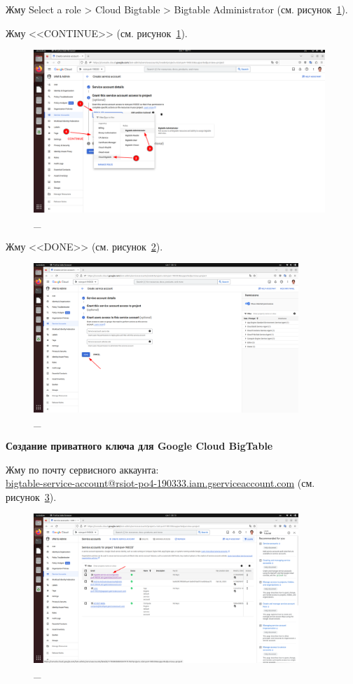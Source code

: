 \documentclass[12pt, a4paper, simple]{eskdtext}
\begin{document}
  Жму Select a role > Cloud Bigtable > Bigtable Administrator (см. рисунок~\ref{fig:12}).

  Жму <<CONTINUE>> (см. рисунок~\ref{fig:12}).

  \begin{figure}[!h]
    \centering
    \includegraphics[width=11cm]
    {images/GoogleCloudBigTable/2023-03-01_08-12-32.png}
    \caption{\_}
    \label{fig:12}
  \end{figure}

  Жму <<DONE>> (см. рисунок~\ref{fig:13}).

  \begin{figure}[!h]
    \centering
    \includegraphics[width=10cm]
    {images/GoogleCloudBigTable/2023-03-01_08-12-57.png}
    \caption{\_}
    \label{fig:13}
  \end{figure}

  \newpage
  \begin{center}
    \textbf{Создание приватного ключа для Google Cloud BigTable}
  \end{center}

  Жму по почту сервисного аккаунта: \\
  \underline{bigtable-service-account@rsiot-po4-190333.iam.gserviceaccount.com} (см. рисунок~\ref{fig:14}).
  
  \begin{figure}[!h]
    \centering
    \includegraphics[width=10cm]
    {images/GoogleCloudBigTable/2023-03-01_08-13-26.png}
    \caption{\_}
    \label{fig:14}
  \end{figure}
\end{document}
